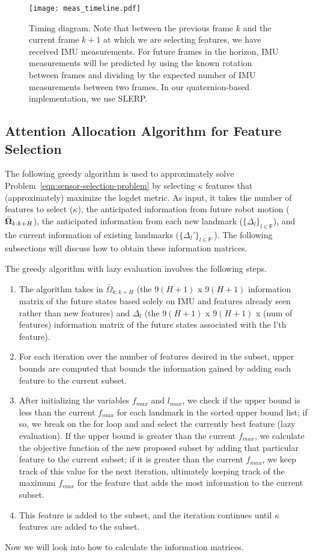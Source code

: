 \begin{figure}
\centering
\texttt{[image: meas\_timeline.pdf]} 
\caption{Timing diagram. Note that between the previous frame $k$ and the current frame $k+1$ at which we are selecting features, we have received IMU measurements. For future frames in the horizon, IMU measurements will be predicted by using the known rotation between frames and dividing by the expected number of IMU measurements between two frames. In our quaternion-based implementation, we use SLERP.}
\label{fig:meas_timeline} 
\end{figure}


\subsection{Attention Allocation Algorithm for Feature Selection}\label{sub:attn_algo}

The following greedy algorithm is used to approximately solve Problem~\eqref{eqn:sensor-selection-problem} by selecting $\kappa$ features that (approximately) maximize the logdet metric.
As input, it takes the number of features to select ($\kappa$), the anticipated information from future robot motion ($\bar{\boldsymbol \Omega}_{k:k+H}$), the anticipated information from each new landmark ($\{\Delta_l\}_{l\in\mathsf{F}}$), and the current information of existing landmarks ($\{\Delta_l'\}_{l\in\mathsf{F}'}$).
The following subsections will discuss how to obtain these information matrices.

The greedy algorithm with lazy evaluation involves the following steps. 
\begin{enumerate}
    \item The algorithm takes in $\bar{\Omega}_{k:k+H}$ (the $9(H+1)$ x $9(H+1)$ information matrix of the future states based solely on IMU and features already seen rather than new features) and $\Delta_l$ (the $9(H+1)$ x $9(H+1)$ x (num of features) information matrix of the future states associated with the l'th feature).
    \item For each iteration over the number of features desired in the subset, upper bounds are computed that bounds the information gained by adding each feature to the current subset.
    \item After initializing the variables $f_{max}$ and $l_{max}$, we check if the upper bound is less than the current $f_{max}$ for each landmark in the sorted upper bound list; if so, we break on the for loop and and select the currently best feature (lazy evaluation). If the upper bound is greater than the current $f_{max}$, we calculate the objective function of the new proposed subset by adding that particular feature to the current subset; if it is greater than the current $f_{max}$, we keep track of this value for the next iteration, ultimately keeping track of the maximum $f_{max}$ for the feature that adds the most information to the current subset.
    \item This feature is added to the subset, and the iteration continues until $\kappa$ features are added to the subset.
\end{enumerate}
Now we will look into how to calculate the information matrices.



